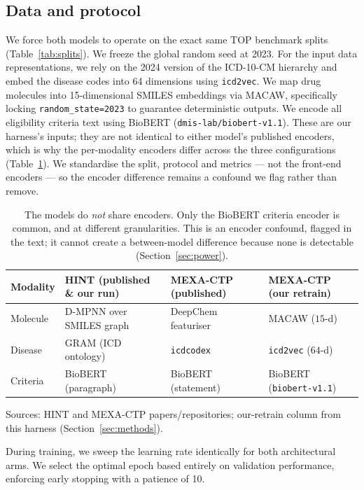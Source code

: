 \documentclass[a4paper,fleqn]{cas-sc}
\begin{document}
\subsection{Data and protocol}
We force both models to operate on the exact same TOP benchmark splits (Table~\ref{tab:splits}). We freeze the global random seed at 2023. For the input data representations, we rely on the 2024 version of the ICD-10-CM hierarchy and embed the disease codes into 64 dimensions using \texttt{icd2vec}. We map drug molecules into 15-dimensional SMILES embeddings via MACAW, specifically locking \texttt{random\_state=2023} to guarantee deterministic outputs. We encode all eligibility criteria text using BioBERT (\texttt{dmis-lab/biobert-v1.1}).
These are our harness's inputs; they are not identical to either model's published encoders,
which is why the per-modality encoders differ across the three configurations
(Table~\ref{tab:encoders}). We standardise the split, protocol and metrics --- not the
front-end encoders --- so the encoder difference remains a confound we flag rather than remove.
\begin{table}[t]
\centering\small
\caption{The models do \emph{not} share encoders. Only the BioBERT criteria encoder is common,
and at different granularities. This is an encoder confound, flagged in the text; it cannot
create a between-model difference because none is detectable (Section~\ref{sec:power}).}
\label{tab:encoders}
\begin{tabular}{llll}
\toprule
Modality & HINT (published \& our run) & MEXA-CTP (published) & MEXA-CTP (our retrain) \\
\midrule
Molecule & D-MPNN over SMILES graph & DeepChem featuriser & MACAW ($15$-d) \\
Disease  & GRAM (ICD ontology) & \texttt{icdcodex} & \texttt{icd2vec} ($64$-d) \\
Criteria & BioBERT (paragraph) & BioBERT (statement) & BioBERT (\texttt{biobert-v1.1}) \\
\bottomrule
\end{tabular}
\begin{minipage}{\linewidth}\vspace{2pt}\scriptsize Sources: HINT \citep{fu2022hint} and
MEXA-CTP \citep{zhang2025mexactp} papers/repositories; our-retrain column from this harness
(Section~\ref{sec:methods}). \end{minipage}
\end{table}
During training, we sweep the learning rate identically for both architectural arms. We select the optimal epoch based entirely on validation performance, enforcing early stopping with a patience of 10.
\end{document}
